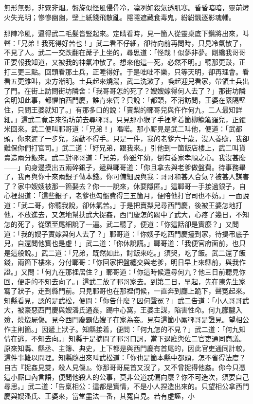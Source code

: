 \begin{myquote}
無形無影，非霧非烟。盤旋似怪風侵骨冷，凜冽如殺氣透肌寒。昏昏暗暗，靈前燈火失光明；慘慘幽幽，壁上紙錢飛散亂。隱隱遮藏食毒鬼，紛紛飄逐影魂幡。
\end{myquote}

那陣冷風，逼得武二毛髮皆豎起來。{}定睛看時，見一箇人從靈桌底下鑽將出來，叫聲：「兄弟！我死得好苦也！」武二看不仔細，卻待向前再問時，只見冷氣散了，不見了人。武二一交跌翻在蓆子上坐的，尋思道：「怪哉！似夢非夢。剛纔我哥哥正要報我知道，又被我的神氣冲散了。想來他這一死，必然不明。」聽那更鼓，正打三更三點。回頭看那土兵，正睡得好。于是咄咄不樂，只等天明，卻再理會。看看五更雞叫，東方漸明。土兵起來燒湯，武二洗漱了，喚起迎兒看家，帶領土兵出了門。在街上訪問街坊隣舍：「我哥哥怎的死了？嫂嫂嫁得何人去了？」那街坊隣舍明知此事，都懼怕西門慶，誰肯來管？只說：「都頭，不消訪問，王婆在緊隔壁住，只問王婆就知了。」有那多口的說：「賣梨的鄆哥兒與仵作何九，二人最知詳細。」這武二竟走來街坊前去尋鄆哥。只見那小猴子手裡拿着箇柳籠簸羅兒，正糴米回來。武二便叫鄆哥道：「兄弟！」唱喏。那小厮見是武二叫他，便道：「武都頭，你來遲了一步兒，須動不得手。只是一件，我的老爹六十歲，沒人養贍，我卻難保你們打官司。」{}武二道：「好兄弟，跟我來。」引他到一箇飯店樓上，武二叫貨賣造兩分飯來。武二對鄆哥道：「兄弟，你雖年幼，倒有養家孝順之心。我沒甚麼——」向身邊摸出五兩碎銀子，遞與鄆哥道：「你且拿去與老爹做盤費。待事務畢了，我再與你十來兩銀子做本錢。你可備細說與我：哥哥和甚人合氣？被甚人謀害了？家中嫂嫂被那一箇娶去？你一一說來，休要隱匿。」這鄆哥一手接過銀子，自心裡想道：「這些銀子，老爹也勾盤費得三五箇月，便陪他打官司也不妨。」一面說道：「武二哥，你聽我說，卻休氣苦。」于是把賣梨兒尋西門慶，後被王婆怎地打他，不放進去，又怎地幫扶武大捉姦，西門慶怎的踢中了武大，心疼了幾日，不知怎的死了，從頭至尾細說了一遍。武二聽了，便道：「你這話卻是實麼？」又問道：「我的嫂子實嫁與何人去了？」鄆哥道：「你嫂子吃西門慶擡到家，待搗弔底子兒，自還問他實也是虛！」武二道：「你休說謊。」鄆哥道：「我便官府面前，也只是這般說。」{}武二道：「兄弟，既然如此，討飯來吃。」須臾，吃了飯。武二還了飯錢，兩箇下樓來，分付鄆哥：「你回家把盤纏交與老爹，明日早上來縣前，與我作證。」又問：「何九在那裡居住？」鄆哥道：「你這時候還尋何九？他三日前聽見你回，便走的不知去向了。」{}這武二放了鄆哥家去。到第二日，早起，先在陳先生家寫了狀子，走到縣門前。只見鄆哥也在那裡伺候，一直奔到廳上跪下，聲冤起來。知縣看見，認的是武松，便問：「你告什麼？因何聲冤？」武二告道：「小人哥哥武大，被豪惡西門慶與嫂潘氏通姦，踢中心窩，王婆主謀，陷害性命。何九朦朧入殮，燒燬屍傷。見今西門慶霸佔嫂子在家為妾。見有這箇小厮鄆哥是證見。望相公作主則箇。」因遞上狀子。知縣接着，便問：「何九怎的不見？」武二道：「何九知情在逃，不知去向。」知縣于是摘問了鄆哥口詞，當下退廳與佐二官吏通同商議。原來知縣、縣丞、主簿、典史，上下都是與西門慶有首尾的，因此官吏通同計較，這件事難以問理。知縣隨出來叫武松道：「你也是箇本縣中都頭，怎不省得法度？自古『捉姦見雙，殺人見傷』。你那哥哥屍首又沒了，又不曾捉得他姦。你今只憑這小厮口內言語，便問他殺人的公事，莫非公道忒偏向麼？你不可造次，須要自己尋思。」武二道：「告稟相公：這都是實情，不是小人捏造出來的。只望相公拿西門慶與嫂潘氏、王婆來，當堂盡法一番，其冤自見。若有虛誣，小